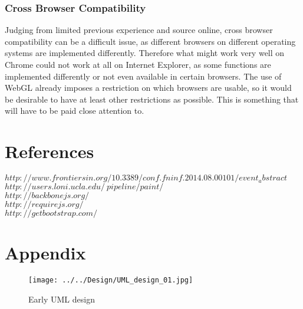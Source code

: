 \documentclass[a4paper,11pt,titlepage]{article}
\begin{document}
\subsubsection{Cross Browser Compatibility}

Judging from limited previous experience and source online, cross browser compatibility can be a difficult issue, as different browsers on different operating systems are implemented differently. Therefore what might work very well on Chrome could not work at all on Internet Explorer, as some functions are implemented differently or not even available in certain browsers. The use of WebGL already imposes a restriction on which browsers are usable, so it would be desirable to have at least other restrictions as possible. This is something that will have to be paid close attention to.


\section{References}

$http://www.frontiersin.org/10.3389/conf.fninf.2014.08.00101/event_abstract$\\
$http://users.loni.ucla.edu/~pipeline/paint/$\\
$http://backbonejs.org/$\\
$http://requirejs.org/$\\
$http://getbootstrap.com/$\\

\section{Appendix}


\begin{figure}[ht!]
\centering
\texttt{[image: ../../Design/UML\_design\_01.jpg]}
\caption{Early UML design}
\label{fig:UIdesign1}
\end{figure}


\begin{figure}[ht]
\end{figure}
\end{document}
